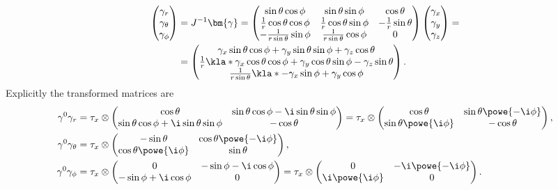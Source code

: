 \documentclass[english, parskip=full]{scrartcl}
\begin{document}
\begin{align}
\begin{pmatrix}
\gamma_r \\ \gamma_\theta \\ \gamma_\phi
\end{pmatrix} &= J^{-1} \bm{\gamma} = \begin{pmatrix}
\sin\theta\cos\phi & \sin\theta\sin\phi & \cos\theta \\
\frac{1}{r}\cos\theta\cos\phi & \frac{1}{r}\cos\theta\sin\phi & -\frac{1}{r} \sin\theta \\
-\frac{1}{r\sin\theta} \sin\phi & \frac{1}{r\sin\theta} \cos\phi & 0
\end{pmatrix} \begin{pmatrix}
\gamma_x \\ \gamma_y \\ \gamma_z
\end{pmatrix} = \\
&= \begin{pmatrix}
\gamma_x \sin\theta\cos\phi + \gamma_y \sin\theta\sin\phi + \gamma_z \cos\theta \\
\frac{1}{r} \kla*{\gamma_x\cos\theta\cos\phi + \gamma_y \cos\theta\sin\phi - \gamma_z \sin\theta} \\
\frac{1}{r\sin\theta} \kla*{-\gamma_x \sin\phi + \gamma_y \cos\phi}
\end{pmatrix}.
\end{align}
Explicitly the transformed matrices are
\begin{align}
\gamma^0\gamma_r &= \tau_x \otimes \begin{pmatrix}
\cos\theta & \sin\theta\cos\phi - \i \sin\theta \sin\phi \\ \sin\theta\cos\phi + \i \sin\theta \sin\phi & -\cos\theta
\end{pmatrix} = \tau_x \otimes \begin{pmatrix}
\cos\theta & \sin\theta\powe{-\i\phi} \\ \sin\theta\powe{\i\phi} & -\cos\theta
\end{pmatrix},\\
\gamma^0\gamma_\theta &= \tau_x \otimes \begin{pmatrix}
-\sin\theta & \cos\theta \powe{-\i\phi} \\ \cos\theta \powe{\i\phi} & \sin\theta
\end{pmatrix},\\
\gamma^0\gamma_\phi &= \tau_x \otimes \begin{pmatrix}
0 & -\sin\phi - \i \cos\phi \\ -\sin\phi + \i\cos\phi & 0
\end{pmatrix} = \tau_x \otimes \begin{pmatrix}
0 & -\i \powe{-\i\phi} \\ \i\powe{\i\phi} & 0
\end{pmatrix}.
\end{align}
\end{document}
